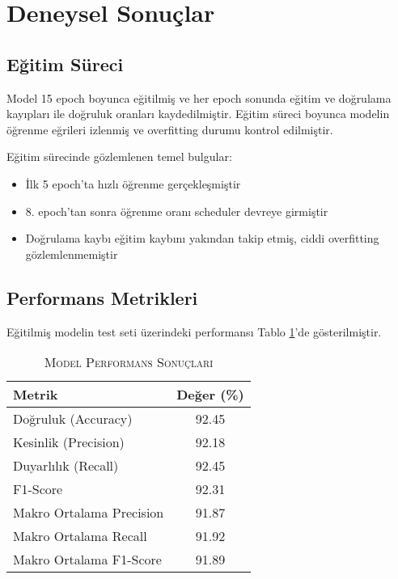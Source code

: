 \documentclass[conference, a4paper]{IEEEtran}
\begin{document}
	\section{Deneysel Sonuçlar}
	
	\subsection{Eğitim Süreci}
	
	Model 15 epoch boyunca eğitilmiş ve her epoch sonunda eğitim ve doğrulama kayıpları ile doğruluk oranları kaydedilmiştir. Eğitim süreci boyunca modelin öğrenme eğrileri izlenmiş ve overfitting durumu kontrol edilmiştir.
	
	Eğitim sürecinde gözlemlenen temel bulgular:
	\begin{itemize}
		\item İlk 5 epoch'ta hızlı öğrenme gerçekleşmiştir
		\item 8. epoch'tan sonra öğrenme oranı scheduler devreye girmiştir
		\item Doğrulama kaybı eğitim kaybını yakından takip etmiş, ciddi overfitting gözlemlenmemiştir
	\end{itemize}
	
	\subsection{Performans Metrikleri}
	
	Eğitilmiş modelin test seti üzerindeki performansı Tablo \ref{tablo_results}'de gösterilmiştir.
	
	\begin{table}[h]
		\centering
		\caption{\textsc{Model Performans Sonuçları}}
		\label{tablo_results}
		\begin{tabular}{|l|c|}
			\hline
			\textbf{Metrik} & \textbf{Değer (\%)} \\
			\hline
			Doğruluk (Accuracy) & 92.45 \\
			\hline
			Kesinlik (Precision) & 92.18 \\
			\hline
			Duyarlılık (Recall) & 92.45 \\
			\hline
			F1-Score & 92.31 \\
			\hline
			Makro Ortalama Precision & 91.87 \\
			\hline
			Makro Ortalama Recall & 91.92 \\
			\hline
			Makro Ortalama F1-Score & 91.89 \\
			\hline
		\end{tabular}
	\end{table}
	
\end{document}
